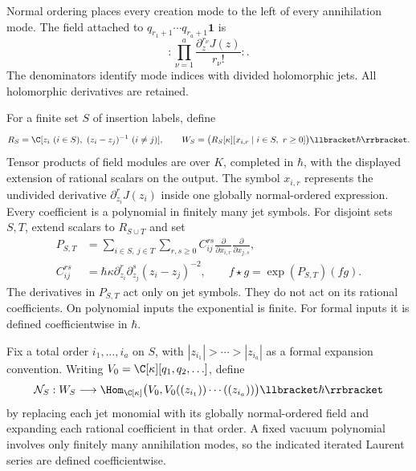 Normal ordering places every creation mode to the left of every
annihilation mode.  The field attached to
$q_{r_1+1}\cdots q_{r_a+1}\mathbf1$ is
\[
 :\prod_{\nu=1}^a\frac{\partial_z^{r_\nu}J(z)}{r_\nu!}:.
\]
The denominators identify mode indices with divided holomorphic jets.
All holomorphic derivatives are retained.

For a finite set $S$ of insertion labels, define
\[
 R_S=\C[z_i\ (i\in S),\ (z_i-z_j)^{-1}\ (i\ne j)],
 \qquad
 W_S=\bigl(R_S[\kappa][x_{i,r}\mid i\in S,\ r\ge0]\bigr)
            \llbracket\hbar\rrbracket.
\]
Tensor products of field modules are over $K$, completed in $\hbar$,
with the displayed extension of rational scalars on the output.
The symbol $x_{i,r}$ represents the undivided derivative
$\partial_{z_i}^rJ(z_i)$ inside one globally normal-ordered expression.
Every coefficient is a polynomial in finitely many jet symbols.  For disjoint
sets $S,T$, extend scalars to $R_{S\cup T}$ and set
\begin{equation*}
 \begin{split}
 P_{S,T}&=\sum_{i\in S,\ j\in T}\sum_{r,s\ge0}
 C_{ij}^{rs}\frac{\partial}{\partial x_{i,r}}
              \frac{\partial}{\partial x_{j,s}},\\
 C_{ij}^{rs}&=\hbar\kappa\partial_{z_i}^r\partial_{z_j}^s
                    (z_i-z_j)^{-2},\qquad
 f\star g=\exp(P_{S,T})(fg).
 \end{split}
\end{equation*}
The derivatives in $P_{S,T}$ act only on jet symbols.  They do not act on
its rational coefficients.  On polynomial inputs the exponential is finite.
For formal inputs it is defined coefficientwise in $\hbar$.

Fix a total order $i_1,\ldots,i_a$ on $S$, with
$|z_{i_1}|>\cdots>|z_{i_a}|$ as a formal expansion convention.
Writing $V_0=\C[\kappa][q_1,q_2,\ldots]$, define
\[
 \mathcal N_S:W_S\longrightarrow
 \Hom_{\C[\kappa]}\bigl(V_0,
 V_0((z_{i_1}))\cdots((z_{i_a}))\bigr)\llbracket\hbar\rrbracket
\]
by replacing each jet monomial with its globally normal-ordered field
and expanding each rational coefficient in that order.  A fixed vacuum
polynomial involves only finitely many annihilation modes, so the indicated
iterated Laurent series are defined coefficientwise.

